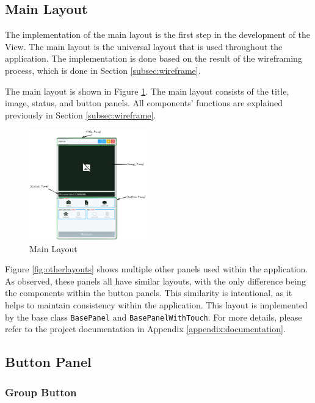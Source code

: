 \subsection {Main Layout}
The implementation of the main layout is the first step in the development of the View. The main layout is the universal layout that is used throughout the application. The implementation is done based on the result of the wireframing process, which is done in Section \ref{subsec:wireframe}.

The main layout is shown in Figure \ref{fig:main_layout}. The main layout consists of the title, image, status, and button panels. All components' functions are explained previously in Section \ref{subsec:wireframe}.

\begin{figure}[!ht]
    \centering
    \includegraphics[width=0.45\textwidth]{texs/Part2/chapter4/image/mainlayout.png}
    \caption{Main Layout}
    \label{fig:main_layout}
\end{figure}

Figure \ref{fig:otherlayouts} shows multiple other panels used within the application. As observed, these panels all have similar layouts, with the only difference being the components within the button panels. This similarity is intentional, as it helps to maintain consistency within the application. This layout is implemented by the base class \texttt{BasePanel} and \texttt{BasePanelWithTouch}. For more details, please refer to the project documentation in Appendix \ref{appendix:documentation}.

\subsection{Button Panel}

\subsubsection{Group Button}

